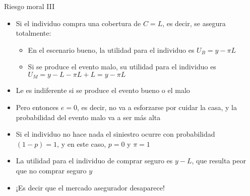 \documentclass{beamer}
\begin{document}
\begin{frame}{Riesgo moral III}
    \begin{itemize}
    \item Si el individuo compra una cobertura de $C=L$, es decir, se asegura totalmente:
    \begin{itemize}
    \item En el escenario bueno, la utilidad para el individuo es 
    $U_B = y - \pi L$
    \item Si se produce el evento malo, su utilidad para el individuo es 
    $U_M = y - L - \pi L + L = y - \pi L$ 
    \end{itemize}
    \item Le es indiferente si se produce el evento bueno o el malo 
    \item Pero entonces $e=0$, es decir, no va a esforzarse por cuidar la casa, y la probabilidad del evento malo va a ser más alta \vspace{2mm}
    \item Si el individuo no hace nada el siniestro ocurre con probabilidad $(1-p)=1$, y en este caso, $p=0$ y $\pi=1$
    \item La utilidad para el individuo de comprar seguro es $y-L$, que resulta peor que no comprar seguro $y$
    \item ¡Es decir que el mercado asegurador desaparece! 
  \end{itemize}   

\hyperlink{volver2}{}
\end{frame}
\end{document}
